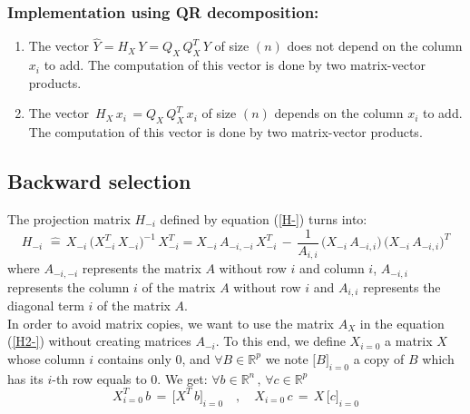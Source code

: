 \subsubsection{Implementation using QR decomposition:}


\begin{enumerate}
\item The vector $\hat{Y}=H_X\,Y=Q_X\,Q_X^T\,Y $ of size $(n)$ does not depend on the column $x_i$ to add.
The computation of this vector is done by two matrix-vector products. 
\item The vector $\,H_X\,x_i\,= Q_X\,Q_X^T\,x_i$ of size $(n)$ depends on the column $x_i$ to add.
The computation of this vector is done by two matrix-vector products. 
\end{enumerate}



\newpage
\subsection{Backward selection}
The projection matrix $H_{-i}$ defined by equation (\ref{H-}) turns into:
 \begin{equation}
\label{H2-}
H_{-i}\, \,\hat{=}\, X_{-i}\,\big(X^T_{-i} \,X_{-i}\big)^{-1} \,X^T_{-i}
= X_{-i}\,A_{-i,-i} \, X^T_{-i} \,-\,\frac {1}{A_{i,i}}\,\big(X_{-i}\, A_{-i,i}\big)\, \big(X_{-i}\, A_{-i,i}\big)^T
 \end{equation}
where $A_{-i,-i}$ represents the matrix $A$ without row $i$ and column $i$,
$A_{-i,i}$ represents the column $i$ of the matrix $A$ without row $i$ and $A_{i,i}$ represents the diagonal term $i$ of the matrix $A$.\\

In order to avoid matrix copies, we want to use the matrix $A_X$ in the equation (\ref{H2-}) without creating matrices $A_{-i }$.
To this end, we define $X_{i=0}$ a matrix $X$ whose column $i$ contains only $0$, and $\forall B \in \mathbb{R}^p$ we note $\big[B\big]_{i=0}$ a copy of $B$ which has its $i$-th row equals to $0$.
We get: $\forall b \in \mathbb{R}^n\,,\, \forall c \in \mathbb{R}^p $
 \begin{equation}
\label{notation0}
X_{i=0}^T\,b \,=\,\big[X^T\,b\big]_{i=0} \quad,\quad X_{i=0}\,c \,=\,X\,\big[c\big]_{i=0}
 \end{equation}


